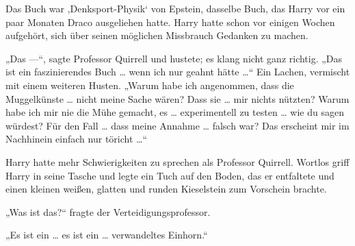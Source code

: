 Das Buch war ‚Denksport-Physik‘ von Epstein, dasselbe Buch, das Harry vor ein paar Monaten Draco ausgeliehen hatte. Harry hatte schon vor einigen Wochen aufgehört, sich über seinen möglichen Missbrauch Gedanken zu machen.

„Das —“, sagte Professor Quirrell und hustete; es klang nicht ganz richtig.
„Das ist ein faszinierendes Buch … wenn ich nur geahnt hätte …“
Ein Lachen, vermischt mit einem weiteren Husten.
„Warum habe ich angenommen, dass die Muggelkünste … nicht meine Sache wären? Dass sie … mir nichts nützten? Warum habe ich mir nie die Mühe gemacht, es … experimentell zu testen … wie du sagen würdest? Für den Fall … dass meine Annahme … falsch war? Das erscheint mir im Nachhinein einfach nur töricht …“

Harry hatte mehr Schwierigkeiten zu sprechen als Professor Quirrell. Wortlos griff Harry in seine Tasche und legte ein Tuch auf den Boden, das er entfaltete und einen kleinen weißen, glatten und runden Kieselstein zum Vorschein brachte.

„Was ist das?“ fragte der Verteidigungsprofessor.

„Es ist ein … es ist ein … verwandeltes Einhorn.“

